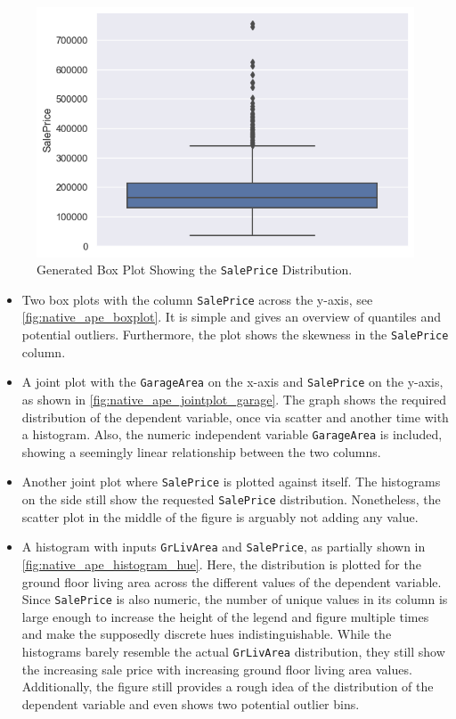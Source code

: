 \begin{figure}[h]
    \centering
    \includegraphics[width=0.5\linewidth]{Tex//images//native_ape_eval//boxplot.png}
    \caption{Generated Box Plot Showing the \texttt{SalePrice} Distribution.}
    \label{fig:native_ape_boxplot}
\end{figure}

\begin{itemize}
    \item Two box plots with the column \verb|SalePrice| across the y-axis, see \autoref{fig:native_ape_boxplot}. It is simple and gives an overview of quantiles and potential outliers. Furthermore, the plot shows the skewness in the \verb|SalePrice| column.
    \item A joint plot with the \verb|GarageArea| on the x-axis and \verb|SalePrice| on the y-axis, as shown in \autoref{fig:native_ape_jointplot_garage}. The graph shows the required distribution of the dependent variable, once via scatter and another time with a histogram. Also, the numeric independent variable \verb|GarageArea| is included, showing a seemingly linear relationship between the two columns.
    \item Another joint plot where \verb|SalePrice| is plotted against itself. The histograms on the side still show the requested \verb|SalePrice| distribution. Nonetheless, the scatter plot in the middle of the figure is arguably not adding any value.
    \item A histogram with inputs \verb|GrLivArea| and \verb|SalePrice|, as partially shown in \autoref{fig:native_ape_histogram_hue}. Here, the distribution is plotted for the ground floor living area across the different values of the dependent variable. Since \verb|SalePrice| is also numeric, the number of unique values in its column is large enough to increase the height of the legend and figure multiple times and make the supposedly discrete hues indistinguishable. While the histograms barely resemble the actual \verb|GrLivArea| distribution, they still show the increasing sale price with increasing ground floor living area values. Additionally, the figure still provides a rough idea of the distribution of the dependent variable and even shows two potential outlier bins.
\end{itemize}

